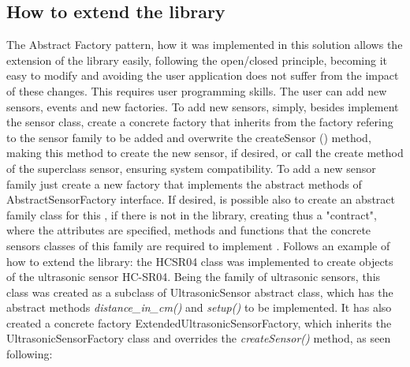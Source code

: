 \documentclass{acm_proc_article-sp}
\begin{document}
\subsection{How to extend the library}
The Abstract Factory pattern, how it was implemented in this solution allows the extension of the library easily, following the  open/closed principle, becoming it easy to modify and avoiding the user application does not suffer from the impact of these changes. This requires user programming skills. The user can add new sensors, events and new factories. To add new sensors, simply, besides implement the sensor class, create a concrete factory that inherits from the factory refering to the sensor family to be added and overwrite the createSensor () method, making this method to create the new sensor, if desired, or call the create method of the superclass sensor, ensuring system compatibility.
\newline
\newline
To add a new sensor family just create a new factory that implements the abstract methods of AbstractSensorFactory interface. If desired, is possible also to create an abstract family class for this , if there is not in  the library, creating thus a "contract", where the attributes are specified, methods and functions that the concrete sensors classes of this family are required to implement .
\newline
\newline
Follows an example of how to extend the library: the HCSR04 class was implemented to create objects of the ultrasonic sensor HC-SR04. Being the family of ultrasonic sensors, this class was created as a subclass of UltrasonicSensor abstract class, which has the abstract methods \textit{distance\_in\_cm()} and \textit{setup()}  to be implemented. It has also created a concrete factory ExtendedUltrasonicSensorFactory, which inherits the UltrasonicSensorFactory class and overrides the \textit{createSensor()} method, as seen following:
\end{document}
